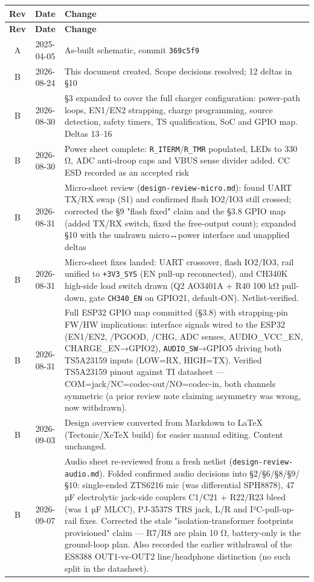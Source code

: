 \documentclass[11pt]{article}
\begin{document}
\footnotesize
\begin{longtable}{@{}c c L{\dimexpr\linewidth-4.2cm}@{}}
\toprule
\textbf{Rev} & \textbf{Date} & \textbf{Change} \\
\midrule
\endfirsthead
\toprule
\textbf{Rev} & \textbf{Date} & \textbf{Change} \\
\midrule
\endhead
A & 2025-04-05 & As-built schematic, commit \texttt{369c5f9} \\
B & 2026-08-24 & This document created. Scope decisions resolved; 12 deltas in §10 \\
B & 2026-08-30 & §3 expanded to cover the full charger configuration: power-path loops, EN1/EN2 strapping, charge programming, source detection, safety timers, TS qualification, SoC and GPIO map. Deltas 13–16 \\
B & 2026-08-30 & Power sheet complete: \texttt{R_ITERM}/\texttt{R_TMR} populated, LEDs to 330 Ω, ADC anti-droop caps and VBUS sense divider added. CC ESD recorded as an accepted risk \\
B & 2026-08-31 & Micro-sheet review (\texttt{design-review-micro.md}): found UART TX/RX swap (S1) and confirmed flash IO2/IO3 still crossed; corrected the §9 "flash fixed" claim and the §3.8 GPIO map (added TX/RX switch, fixed the free-output count); expanded §10 with the undrawn micro↔power interface and unapplied deltas \\
B & 2026-08-31 & Micro-sheet fixes landed: UART crossover, flash IO2/IO3, rail unified to \texttt{+3V3_SYS} (EN pull-up reconnected), and CH340K high-side load switch drawn (Q2 AO3401A + R40 100 kΩ pull-down, gate \texttt{CH340_EN} on GPIO21, default-ON). Netlist-verified. \\
B & 2026-08-31 & Full ESP32 GPIO map committed (§3.8) with strapping-pin FW/HW implications: interface signals wired to the ESP32 (EN1/EN2, /PGOOD, /CHG, ADC senses, AUDIO_VCC_EN, CHARGE_EN→GPIO2), \texttt{AUDIO_SW}→GPIO5 driving both TS5A23159 inputs (LOW=RX, HIGH=TX). Verified TS5A23159 pinout against TI datasheet — COM=jack/NC=codec-out/NO=codec-in, both channels symmetric (a prior review note claiming asymmetry was wrong, now withdrawn). \\
B & 2026-09-03 & Design overview converted from Markdown to LaTeX (Tectonic/XeTeX build) for easier manual editing. Content unchanged. \\
B & 2026-09-07 & Audio sheet re-reviewed from a fresh netlist (\texttt{design-review-audio.md}). Folded confirmed audio decisions into §2/§6/§8/§9/§10: single-ended ZTS6216 mic (was differential SPH8878), 47 µF electrolytic jack-side couplers C1/C21 + R22/R23 bleed (was 1 µF MLCC), PJ-3537S TRS jack, L/R and I²C-pull-up-rail fixes. Corrected the stale "isolation-transformer footprints provisioned" claim — R7/R8 are plain 10 Ω, battery-only is the ground-loop plan. Also recorded the earlier withdrawal of the ES8388 OUT1-vs-OUT2 line/headphone distinction (no such split in the datasheet). \\

\end{longtable}
\end{document}
